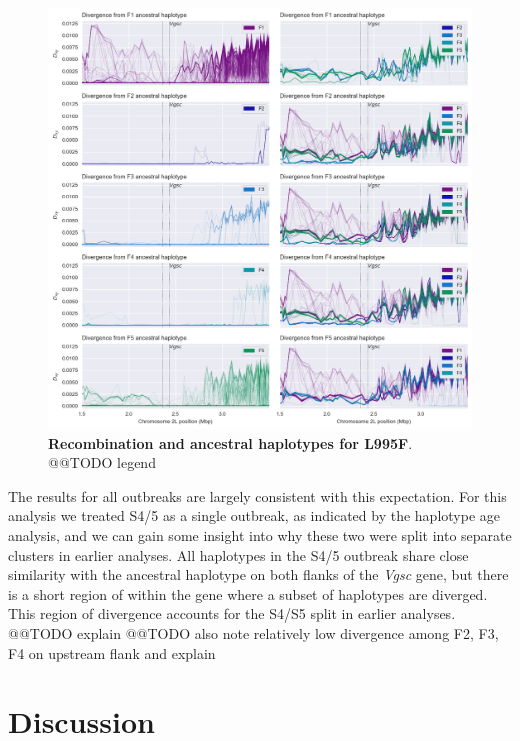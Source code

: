 \documentclass[a4paper,11pt,abstracton,hidelinks]{scrartcl}
\begin{document}
%
\begin{figure}[!b]
  \includegraphics[width=1.1\linewidth,center]{artwork/fig_recom.png}
  \caption{\textbf{Recombination and ancestral haplotypes for L995F}. @@TODO legend}
  \label{fig:recom_f}
\end{figure}


%
The results for all outbreaks are largely consistent with this expectation.
%
For this analysis we treated S4/5 as a single outbreak, as indicated by the haplotype age analysis, and we can gain some insight into why these two were split into separate clusters in earlier analyses.
%
All haplotypes in the S4/5 outbreak share close similarity with the ancestral haplotype on both flanks of the \textit{Vgsc} gene, but there is a short region of within the gene where a subset of haplotypes are diverged.
%
This region of divergence accounts for the S4/S5 split in earlier analyses.
%
@@TODO explain
%
@@TODO also note relatively low divergence among F2, F3, F4 on upstream flank and explain


\section*{Discussion}
\end{document}
